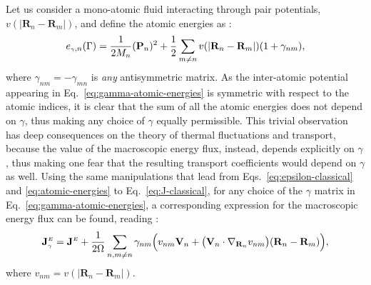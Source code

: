 Let us consider a mono-atomic fluid interacting through pair potentials, $v(|\mathbf{R}_n-\mathbf{R}_m|)$, and define the atomic energies as \citep{Marcolongo2014,Ercole2016}:
\begin{equation}
  e_{\smallgamma,n}(\rGamma) =
  \frac{1}{2M_n}(\mathbf{P}_{n})^{2} + \frac{1}{2}\sum_{m\ne n}
  v(|\mathbf{R}_{n}-\mathbf{R}_{m}|)
  (1+\gamma_{nm}), \label{eq:gamma-atomic-energies}
\end{equation}
where $\gamma_{nm}=-\gamma_{mn}$ is \emph{any} antisymmetric matrix.
As the inter-atomic potential appearing in Eq.~\eqref{eq:gamma-atomic-energies} is symmetric with respect to the atomic indices, it is clear that the sum of all the atomic energies does not depend on $\gamma$, thus making any choice of $\gamma$ equally permissible. This trivial observation has deep consequences on the theory of thermal fluctuations and transport, because the value of the macroscopic energy flux, instead, depends explicitly on $\gamma$, thus making one fear that the resulting transport coefficients would depend on $\gamma$ as well. Using the same manipulations that lead from Eqs.~\eqref{eq:epsilon-classical} and \eqref{eq:atomic-energies} to Eq.~\eqref{eq:J-classical}, for any choice of the $\gamma$ matrix in Eq.~\eqref{eq:gamma-atomic-energies}, a corresponding expression for the macroscopic energy flux can be found, reading \citep{Marcolongo2014,Ercole2016}:
\begin{equation}
  \mathbf{J}_{\smallgamma}^\smallE=\mathbf{J}^\smallE+
  \frac{1}{2 \rOmega}\sum_{n,m\ne n}\gamma_{nm} \Bigl ( v_{nm} \mathbf{V}_{n} + \bigl (\mathbf{V}_{n}\cdot \nabla_{\mathbf{R}_n} v_{nm} \bigr )  (\mathbf{R}_{n}-\mathbf{R}_{m}) \Bigr ), \label{eq:gamma-classical-current}
\end{equation}
where $v_{nm}= v(|\mathbf{R}_{n} - \mathbf{R}_{m}|)$.

